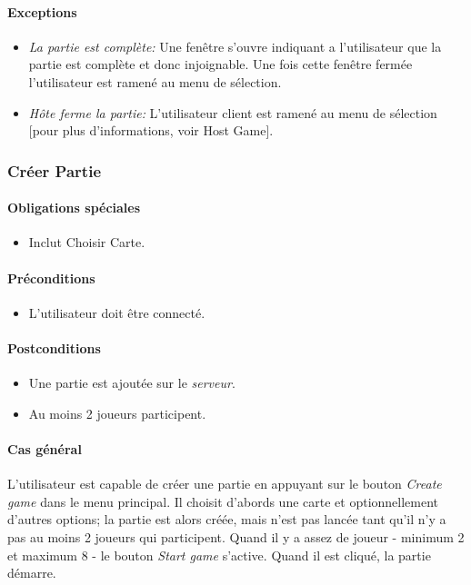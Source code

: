 \documentclass[a4paper,11pt]{report}
\begin{document}
\paragraph{Exceptions}
\begin{itemize}
 \item \textit{La partie est complète:} Une fenêtre s'ouvre indiquant a l'utilisateur que la partie est complète
 et donc injoignable. Une fois cette fenêtre fermée l'utilisateur est ramené au menu de sélection.
 \item \textit{Hôte ferme la partie:} L'utilisateur client est ramené au menu de sélection [pour plus d'informations, voir
 Host Game]. 
\end{itemize}

\subsubsection{Créer Partie}
\paragraph{Obligations spéciales}
\begin{itemize}
 \item Inclut Choisir Carte.
\end{itemize}
\paragraph{Préconditions}
\begin{itemize}
 \item L'utilisateur doit être connecté.
\end{itemize}
\paragraph{Postconditions}
\begin{itemize}
 \item Une partie est ajoutée sur le \textit{serveur}.
 \item Au moins 2 joueurs participent.
\end{itemize}
\paragraph{Cas général}
L'utilisateur est capable de créer une partie en appuyant sur le bouton \og \textit{Create game} \fg dans le menu principal.
Il choisit d'abords une carte et optionnellement d'autres options; la partie est alors créée, mais n'est pas lancée tant qu'il n'y a pas au moins 2 joueurs qui participent.
Quand il y a assez de joueur - minimum 2 et maximum 8 - le bouton \og \textit{Start game} \fg s'active. Quand il est cliqué, la partie démarre.
\end{document}
